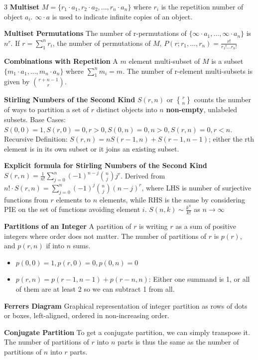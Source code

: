 \documentclass[10pt, landscape]{article}
\begin{document}
\begin{multicols*}{3}
\textbf{Multiset} $M=\{r_1\cdot a_1, r_2\cdot a_2,...,r_n\cdot a_n\}$ where $r_i$ is the repetition number of object $a_i$. $\infty \cdot a$ is used to indicate infinite copies of an object.

\textbf{Multiset Permutations} The number of r-permutations of $\{\infty\cdot a_1,...,\infty \cdot a_n\}$ is $n^r$. If $r=\sum_1^n r_i$, the number of permutations of $M$, $P(r;r_1,...,r_n)=\frac{r!}{r_1!...r_n!}$

\textbf{Combinations with Repetition} A $m$ element multi-subset of $M$ is a subset $\{m_1\cdot a_1,...,m_n\cdot a_n\}$ where $\sum_1^nm_i=m$. The number of r-element multi-subsets is given by ${r+n-1 \choose r}$.

\textbf{Stirling Numbers of the Second Kind} $S(r,n)$ or $r \brace n$ counts the number of ways to partition a set of $r$ distinct objects into $n$ \textbf{non-empty}, unlabeled subsets. Base Cases: $S(0,0)=1, S(r,0)=0, r>0, S(0, n)=0, n>0, S(r,n)=0, r <n$. Recursive Definition: $S(r,n)=nS(r-1,n)+S(r-1, n-1)$; either the rth element is in its own subset or it joins an existing subset.

\textbf{Explicit formula for Stirling Numbers of the Second Kind} $S(r,n)=\frac{1}{n!}\sum_{j=0}^n(-1)^{n-j}{n \choose j}j^r$. Derived from $n!\cdot S(r,n)=\sum_{j=0}^n(-1)^j{n \choose j}(n-j)^r$, where LHS is number of surjective functions from $r$ elements to $n$ elements, while RHS is the same by considering PIE on the set of functions avoiding element $i$. $S(n,k)\sim \frac{k^n}{k!}$ as $n \rightarrow \infty$

\textbf{Partitions of an Integer} A partition of $r$ is writing $r$ as a sum of positive integers where order does not matter. The number of partitions of $r$ is $p(r)$, and  $p(r,n)$ if into $n$ sums.
\begin{itemize}
    \item $p(0,0)=1, p(r,0)=0, p(0,n)=0$
    \item $p(r, n)=p(r-1, n-1)+p(r-n, n)$: Either one summand is 1, or all of them are at least 2 so we can subtract 1 from all.
\end{itemize}

\textbf{Ferrers Diagram} Graphical representation of integer partition as rows of dots or boxes, left-aligned, ordered in non-increasing order.

\textbf{Conjugate Partition} To get a conjugate partition, we can simply transpose it. The number of partitions of $r$ into $n$ parts is thus the same as the number of partitions of $n$ into $r$ parts.


\end{multicols*}
\end{document}
